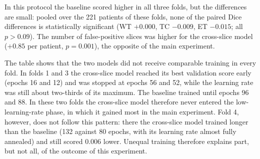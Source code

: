 \begin{table}[htbp]\centering\small
\caption{Supplementary long-training experiment with early stopping (folds in which both runs completed; training stops 40 epochs after the best validation epoch)}\label{tab:long}
\end{table}

In this protocol the baseline scored higher in all three folds, but the differences are small: pooled over the 221 patients of these folds, none of the paired Dice differences is statistically significant (WT $+0.000$, TC $-0.009$, ET $-0.015$; all $p > 0.09$). The number of false-positive slices was higher for the cross-slice model ($+0.85$ per patient, $p = 0.001$), the opposite of the main experiment.

The table shows that the two models did not receive comparable training in every fold. In folds 1 and 3 the cross-slice model reached its best validation score early (epochs 16 and 12) and was stopped at epochs 56 and 52, while the learning rate was still about two-thirds of its maximum. The baseline trained until epochs 96 and 88. In these two folds the cross-slice model therefore never entered the low-learning-rate phase, in which it gained most in the main experiment. Fold 4, however, does not follow this pattern: there the cross-slice model trained longer than the baseline (132 against 80 epochs, with its learning rate almost fully annealed) and still scored 0.006 lower. Unequal training therefore explains part, but not all, of the outcome of this experiment.

